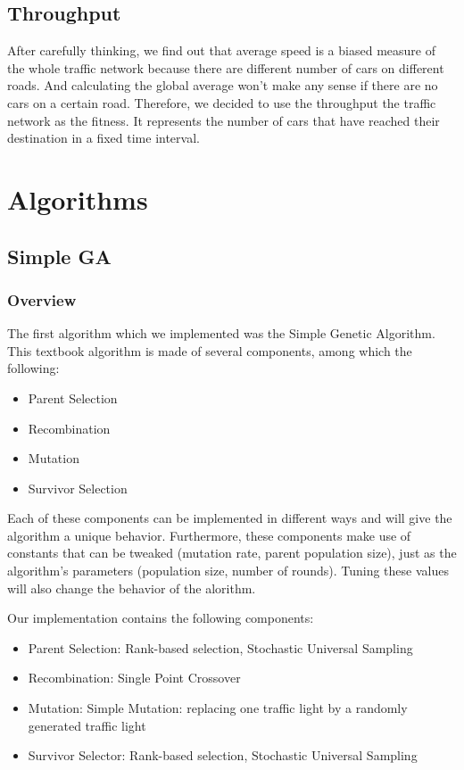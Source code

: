 \documentclass{article} %
\begin{document}
\subsection{Throughput}
After carefully thinking, we find out that average speed is a biased measure of the whole traffic network because there are different number of cars on different roads. And calculating the global average won't make any sense if there are no cars on a certain road. Therefore, we decided to use the throughput the traffic network as the fitness. It represents the number of cars that have reached their destination in a fixed time interval.

\section{Algorithms}

\subsection{Simple GA}

\subsubsection{Overview}
The first algorithm which we implemented was the Simple Genetic Algorithm. This textbook algorithm is made of several components, among which the following:
\begin{itemize}
 \item Parent Selection
 \item Recombination
 \item Mutation
 \item Survivor Selection
\end{itemize}
Each of these components can be implemented in different ways and will give the algorithm a unique behavior. Furthermore, these components make use of constants that can be tweaked (mutation rate, parent population size), just as the algorithm's parameters (population size, number of rounds). Tuning these values will also change the behavior of the alorithm.

Our implementation contains the following components:
\begin{itemize}
 \item Parent Selection: Rank-based selection, Stochastic Universal Sampling
 \item Recombination: Single Point Crossover
 \item Mutation: Simple Mutation: replacing one traffic light by a randomly generated traffic light
 \item Survivor Selector: Rank-based selection, Stochastic Universal Sampling
\end{itemize}
\end{document}
